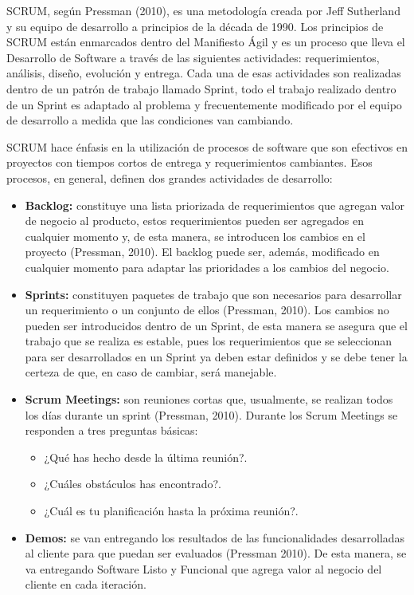 SCRUM, según Pressman (2010), es una metodología creada por Jeff Sutherland y su equipo de desarrollo a principios de la década de 1990. Los principios de SCRUM están enmarcados dentro del Manifiesto Ágil y es un proceso que lleva el Desarrollo de Software a través de las siguientes actividades: requerimientos, análisis, diseño, evolución y entrega. Cada una de esas actividades son realizadas dentro de un patrón de trabajo llamado Sprint, todo el trabajo realizado dentro de un Sprint es adaptado al problema y frecuentemente modificado por el equipo de desarrollo a medida que las condiciones van cambiando.

SCRUM hace énfasis en la utilización de procesos de software que son efectivos en proyectos con tiempos cortos de entrega y requerimientos cambiantes. Esos procesos, en general, definen dos grandes actividades de desarrollo:

\begin{itemize}
\item \textbf{Backlog:} constituye una lista priorizada de requerimientos que agregan valor de negocio al producto, estos requerimientos pueden ser agregados en cualquier momento y, de esta manera, se introducen los cambios en el proyecto (Pressman, 2010). El backlog puede ser, además, modificado en cualquier momento para adaptar las prioridades a los cambios del negocio.
\item \textbf{Sprints:} constituyen paquetes de trabajo que son necesarios para desarrollar un requerimiento o un conjunto de ellos (Pressman, 2010). Los cambios no pueden ser introducidos dentro de un Sprint, de esta manera se asegura que el trabajo que se realiza es estable, pues los requerimientos que se seleccionan para ser desarrollados en un Sprint ya deben estar definidos y se debe tener la certeza de que, en caso de cambiar, será manejable.
\item \textbf{Scrum Meetings:} son reuniones cortas que, usualmente, se realizan todos los días durante un sprint (Pressman, 2010). Durante los Scrum Meetings se responden a tres preguntas básicas:
\begin{itemize}
\item ¿Qué has hecho desde la última reunión?.
\item ¿Cuáles obstáculos has encontrado?.
\item ¿Cuál es tu planificación hasta la próxima reunión?.
\end{itemize}
\item \textbf{Demos:} se van entregando los resultados de las funcionalidades desarrolladas al cliente para que puedan ser evaluados (Pressman 2010). De esta manera, se va entregando Software Listo y Funcional que agrega valor al negocio del cliente en cada iteración.
\end{itemize}


